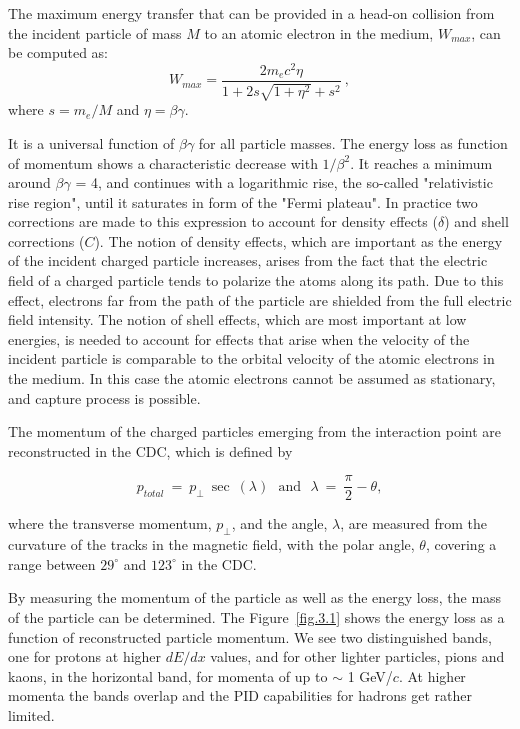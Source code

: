 The maximum energy transfer that can be provided in a head-on collision from the incident particle of mass $M$ to an atomic electron in the medium, $W_{max}$, can be computed as:
\begin{equation}
    \label{eq.3.2}
    W_{max} = \frac{2 m_e c^2 \eta}{1 + 2 s \sqrt{1 + \eta^2} + s^2}~,
\end{equation}
where $s = m_e/M$ and $\eta = \beta \gamma$.
~\par It is a universal function of $\beta \gamma$ for all particle masses. The energy loss as function of momentum shows a characteristic decrease with $1/\beta^{2}$. It reaches a minimum around $\beta \gamma$ = 4, and continues with a logarithmic rise, the so-called "relativistic rise region", until it saturates in form of the "Fermi plateau". In practice two corrections are made to this expression to account for density effects ($\delta$) and shell corrections ($C$). The notion of density effects, which are important as the energy of the incident charged particle increases, arises from the fact that the electric field of a charged particle tends to polarize the atoms along its path. Due to this effect, electrons far from the path of the particle are shielded from the full electric field intensity. The notion of shell effects, which are most important at low energies, is needed to account for effects that arise when the velocity of the incident particle is comparable to the orbital velocity of the atomic electrons in the medium. In this case the atomic electrons cannot be assumed as stationary, and capture process is possible.
~\par The momentum of the charged particles emerging from the interaction point are reconstructed in the CDC, which is defined by

\begin{equation}
    \label{eq.3.2.1}
    p_{total}~=~p_{\perp}~\sec~(\lambda)~~~\mathrm{and}~~~\lambda~=~\frac{\pi}{2}-\theta,
\end{equation}

\noindent where the transverse momentum, $p_{\perp}$, and the angle, $\lambda$, are measured from the curvature of the tracks in the magnetic field, with the polar angle, $\theta$, covering a range between $29^{\circ}$ and $123^{\circ}$ in the CDC.
~\par By measuring the momentum of the particle as well as the energy loss, the mass of the particle can be determined. The Figure~\ref{fig.3.1} shows the energy loss as a function of reconstructed particle momentum. We see two distinguished bands, one for protons at higher $dE/dx$ values, and for other lighter particles, pions and kaons, in the horizontal band, for momenta of up to $\sim$ 1 GeV/$c$. At higher momenta the bands overlap and the PID capabilities for hadrons get rather limited.

